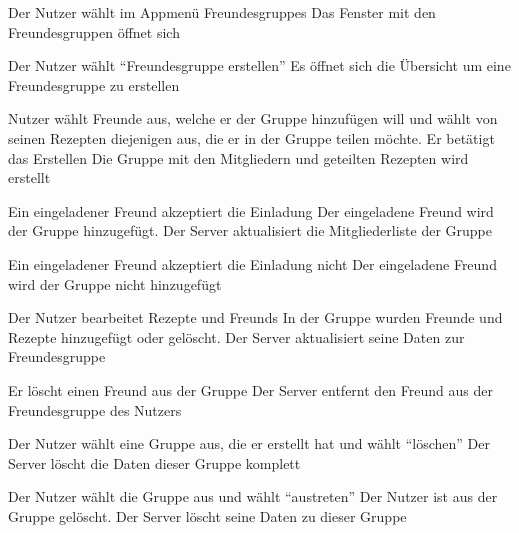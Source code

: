 {Der Nutzer wählt im Appmenü \glspl{Freundesgruppe}}
{Das Fenster mit den Freundesgruppen öffnet sich}

{Der Nutzer wählt "`Freundesgruppe erstellen"'}
{Es öffnet sich die Übersicht um eine Freundesgruppe zu erstellen}

{Nutzer wählt Freunde aus, welche er der Gruppe hinzufügen will und wählt von seinen Rezepten diejenigen aus, die er in der Gruppe teilen möchte. Er betätigt das Erstellen}
{Die Gruppe mit den Mitgliedern und geteilten Rezepten wird erstellt}

{Ein eingeladener Freund akzeptiert die Einladung}
{Der eingeladene Freund wird der Gruppe hinzugefügt. Der Server aktualisiert die Mitgliederliste der Gruppe}

{Ein eingeladener Freund akzeptiert die Einladung nicht}
{Der eingeladene Freund wird der Gruppe nicht hinzugefügt}



{Der Nutzer bearbeitet Rezepte und \glspl{Freund}}
{In der Gruppe wurden Freunde und Rezepte hinzugefügt oder gelöscht. Der Server aktualisiert seine Daten zur Freundesgruppe}

{Er löscht einen Freund aus der Gruppe}
{Der Server entfernt den Freund aus der Freundesgruppe des Nutzers}


{Der Nutzer wählt eine Gruppe aus, die er erstellt hat und wählt "`löschen"'}
{Der Server löscht die Daten dieser Gruppe komplett}

{Der Nutzer wählt die Gruppe aus und wählt "`austreten"'}
{Der Nutzer ist aus der Gruppe gelöscht. Der Server löscht seine Daten zu dieser Gruppe}

